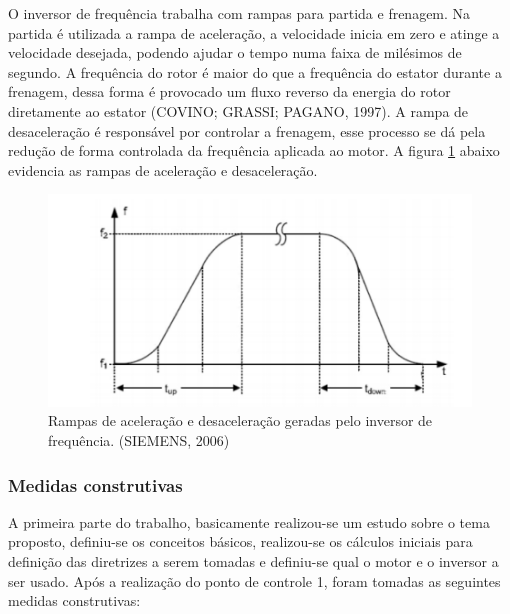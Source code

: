 O inversor de frequência trabalha com rampas para partida e frenagem. Na partida é utilizada a rampa de aceleração, a velocidade inicia em zero e atinge a velocidade desejada, podendo ajudar o tempo numa faixa de milésimos de segundo. A frequência do rotor é maior do que a frequência do estator durante a frenagem, dessa forma é provocado um fluxo reverso da energia do rotor diretamente ao estator (COVINO; GRASSI; PAGANO, 1997). A rampa de desaceleração é responsável por controlar a frenagem, esse processo se dá pela redução de forma controlada da frequência aplicada ao motor. A figura \ref{rampas} abaixo evidencia as rampas de aceleração e desaceleração.

\begin{figure}[H]
    \centering
        \includegraphics[keepaspectratio=true,scale=0.9]{figuras/4.png}
    \caption{Rampas de aceleração e desaceleração geradas pelo inversor de frequência. (SIEMENS, 2006)}
    \label{rampas}
\end{figure}

\subsubsection*{Medidas construtivas}

A primeira parte do trabalho, basicamente realizou-se um estudo sobre o tema proposto, definiu-se os conceitos básicos, realizou-se os cálculos iniciais para definição das diretrizes a serem tomadas e definiu-se qual o motor e o inversor a ser usado. Após a realização do ponto de controle 1, foram tomadas as seguintes medidas construtivas:

